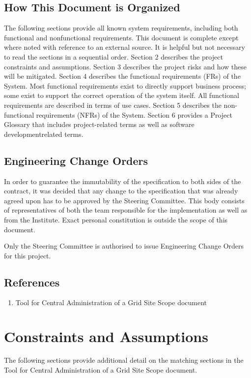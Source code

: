 \documentclass[12pt]{article}
\begin{document}
\subsection{How This Document is Organized}

The following sections provide all known system requirements, including both functional and nonfunctional requirements. 
This document is complete except where noted with reference to an external source. It is helpful but not necessary to read 
the sections in a sequential order. Section 2 describes the project constraints and assumptions. Section 3 describes the 
project risks and how these will be mitigated. Section 4 describes the functional requirements (FRs) of the System. Most 
functional requirements exist to directly support business process; some exist to support the correct operation of the system 
itself. All functional requirements are described in terms of use cases. Section 5 describes the non-functional requirements 
(NFRs) of the System. Section 6 provides a Project Glossary that includes project-related terms as well as software 
developmentrelated terms.

\subsection{Engineering Change Orders}
\label{steering-committee}

In order to guarantee the immutability of the specification to both sides of the
contract, it was decided that any change to the specification that was already
agreed upon has to be approved by the Steering Committee.  This body consists of
representatives of both the team responsible for the implementation as well as
from the Institute.  Exact personal constitution is outside the scope of this
document.

Only the Steering Committee is authorised to issue Engineering Change Orders for
this project.

\subsection{References}

\begin{enumerate}
	\item Tool for Central Administration of a Grid Site Scope document
\end{enumerate}


\section{Constraints and Assumptions}
The following sections provide additional detail on the matching sections in the Tool for Central Administration of a Grid Site 
Scope document.
\end{document}
